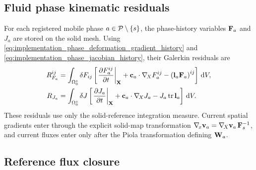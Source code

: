 \subsection{Fluid phase kinematic residuals}
\label{sec:phase_kinematic_weak_forms}

For each registered mobile phase \(a\in\mathcal{P}\setminus\{s\}\), the
phase-history variables \(\mathbf{F}_a\) and \(J_a\) are stored on the solid mesh.
Using \eqref{eq:implementation_phase_deformation_gradient_history} and
\eqref{eq:implementation_phase_jacobian_history}, their Galerkin residuals are
\begin{subequations}
	\label{eq:implementation_phase_history_residuals}
	\begin{align}
		R_{F_a}^{ij}
		 & =
		\int_{\Omega_0^s}
		\delta F_{ij}
		\left[
			\left.\frac{\partial F_a^{ij}}{\partial t}\right|_{\mathbf{X}}
			+\mathbf{c}_a\cdot\nabla_{\!X} F_a^{ij}
			-\left(\mathbf{l}_a\mathbf{F}_a\right)^{ij}
		\right]\,\mathrm{d} V,
		\label{eq:implementation_phase_deformation_gradient_residual} \\
		R_{J_a}
		 & =
		\int_{\Omega_0^s}
		\delta J
		\left[
			\left.\frac{\partial J_a}{\partial t}\right|_{\mathbf{X}}
			+\mathbf{c}_a\cdot\nabla_{\!X} J_a
			-J_a\operatorname{tr}\mathbf{l}_a
		\right]\,\mathrm{d} V .
		\label{eq:implementation_phase_jacobian_residual}
	\end{align}
\end{subequations}
These residuals use only the solid-reference integration measure.  Current
spatial gradients enter through the explicit solid-map transformation
\(\nabla_{\!x}\mathbf{v}_a=\nabla_{\!X}\mathbf{v}_a\,\mathbf{F}_s^{-1}\), and current fluxes enter only
after the Piola transformation defining \(\mathbf{W}_a\).

\subsection{Reference flux closure}
\label{sec:reference_flux_closure}

